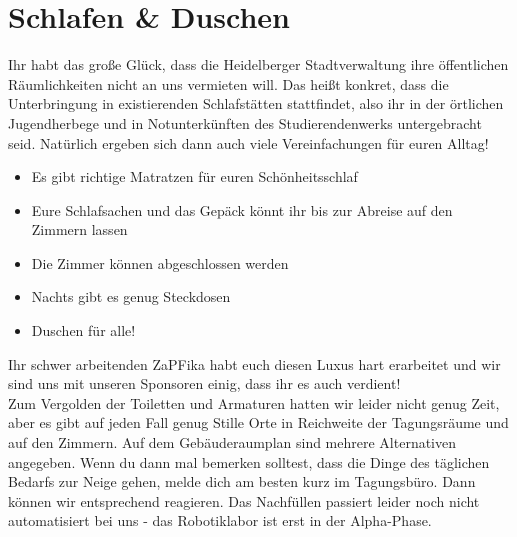 
\section{Schlafen \& Duschen}
Ihr habt das große Glück, dass die Heidelberger Stadtverwaltung ihre öffentlichen Räumlichkeiten nicht an uns vermieten will. Das heißt konkret, dass die Unterbringung in existierenden Schlafstätten stattfindet, also ihr in der örtlichen Jugendherbege und in Notunterkünften des Studierendenwerks untergebracht seid. Natürlich ergeben sich dann auch viele Vereinfachungen für euren Alltag! \\
\begin{itemize}
  \item Es gibt richtige Matratzen für euren Schönheitsschlaf
  \item Eure Schlafsachen und das Gepäck könnt ihr bis zur Abreise auf den Zimmern lassen
  \item Die Zimmer können abgeschlossen werden
  \item Nachts gibt es genug Steckdosen
  \item Duschen für alle!
\end{itemize}

Ihr schwer arbeitenden ZaPFika habt euch diesen Luxus hart erarbeitet und wir sind uns mit unseren Sponsoren einig, dass ihr es auch verdient! \\

Zum Vergolden der Toiletten und Armaturen hatten wir leider nicht genug Zeit, aber es gibt auf jeden Fall genug Stille Orte in Reichweite der Tagungsräume und auf den Zimmern. Auf dem Gebäuderaumplan 
sind mehrere Alternativen angegeben. Wenn du dann mal bemerken solltest, dass die Dinge des täglichen Bedarfs zur Neige gehen, melde dich am besten kurz im Tagungsbüro.  Dann können wir entsprechend reagieren. Das Nachfüllen passiert leider noch nicht automatisiert bei uns - das Robotiklabor ist erst in der Alpha-Phase.
